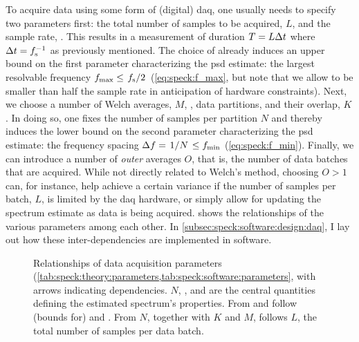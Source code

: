 To acquire data using some form of (digital) \gls{daq}, one usually needs to specify two parameters first: the total number of samples to be acquired, $L$, and the sample rate, \fs.
This results in a measurement of duration $T = L\Delta t$ where $\Delta t = f_{\mathrm{s}}^{-1}$ as previously mentioned.
The choice of \fs already induces an upper bound on the first parameter characterizing the \gls{psd} estimate: the largest resolvable frequency $\fmax\leq\flatfrac{\fs}{2}$ (\cf \cref{eq:speck:f_max}, but note that we allow \fmax to be smaller than half the sample rate in anticipation of hardware constraints).
Next, we choose a number of Welch averages, $M$, \ie, data partitions, and their overlap, $K$.
In doing so, one fixes the number of samples per partition $N$ and thereby induces the lower bound on the second parameter characterizing the \gls{psd} estimate: the frequency spacing $\df = \flatfrac{1}{N} \leq \fmin$ (\cf \cref{eq:speck:f_min}).
Finally, we can introduce a number of \emph{outer} averages $O$, that is, the number of data batches that are acquired.
While not directly related to Welch's method, choosing $O > 1$ can, for instance, help achieve a certain variance if the number of samples per batch, $L$, is limited by the \acrlong{daq} hardware, or simply allow for updating the spectrum estimate as data is being acquired.
 shows the relationships of the various parameters among each other.
In \cref{subsec:speck:software:design:daq}, I lay out how these inter-dependencies are implemented in software.

\begin{figure}[htpb]
    \centering
    
    \caption{
        Relationships of data acquisition parameters (\cf \cref{tab:speck:theory:parameters,tab:speck:software:parameters}, with arrows indicating dependencies.
        $N$, \fs, and \df are the central quantities defining the estimated spectrum's properties.
        From \fs and \df follow (bounds for) \fmax and \fmin.
        From $N$, together with $K$ and $M$, follows $L$, the total number of samples per data batch.
    }
    \label{fig:speck:theory:parameters}
\end{figure}
